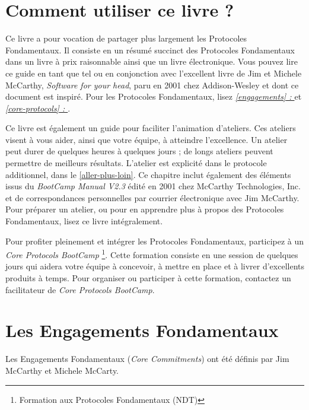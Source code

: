 \documentclass[11pt]{book}
\newcommand*{\numref}[1]{{\hyperref[{#1}]{\autoref*{#1}}}}
\newcommand*{\fullref}[1]{\textit{\hyperref[{#1}]{\autoref*{#1} : \nameref*{#1}}}}
\begin{document}
\mainmatter

\chapter{Comment utiliser ce livre ?} \label{utiliser-ce-livre}

Ce livre a pour vocation de partager plus largement les Protocoles Fondamentaux. Il consiste en un résumé succinct des
Protocoles Fondamentaux dans un livre à prix raisonnable ainsi que un livre électronique. Vous pouvez lire ce guide en tant que
tel ou en conjonction avec l'excellent livre de Jim et Michele McCarthy, \emph{Software for your head}, paru en 2001
chez Addison-Wesley et dont ce document est inspiré. Pour les Protocoles Fondamentaux, lisez \fullref{engagements} et
\fullref{core-protocols}.

Ce livre est également un guide pour faciliter l'animation d'ateliers. Ces ateliers visent à vous aider, ainsi que
votre équipe, à atteindre l'excellence. Un atelier peut durer de quelques heures à quelques jours ; de longs ateliers
peuvent permettre de meilleurs résultats. L'atelier est explicité dans le protocole additionnel, 
dans le \numref{aller-plus-loin}. Ce chapitre inclut également des éléments issus du \emph{BootCamp Manual V2.3} édité en
2001 chez McCarthy Technologies, Inc. et de correspondances personnelles par courrier électronique avec Jim McCarthy. Pour
préparer un atelier, ou pour en apprendre plus à propos des Protocoles Fondamentaux, lisez ce livre intégralement.

Pour profiter pleinement et intégrer les Protocoles Fondamentaux, participez à un \emph{Core Protocols BootCamp}
\footnote{Formation aux Protocoles Fondamentaux (NDT)}. Cette formation consiste en une session de quelques jours qui aidera
votre équipe à concevoir, à mettre en place et à livrer d'excellents produits à temps. Pour organiser ou participer à cette
formation, contactez un facilitateur de \emph{Core Protocols BootCamp}.

\chapter{Les Engagements Fondamentaux} \label{engagements}

Les Engagements Fondamentaux (\emph{Core Commitments}) ont été définis par Jim McCarthy et Michele McCarty.
\end{document}
